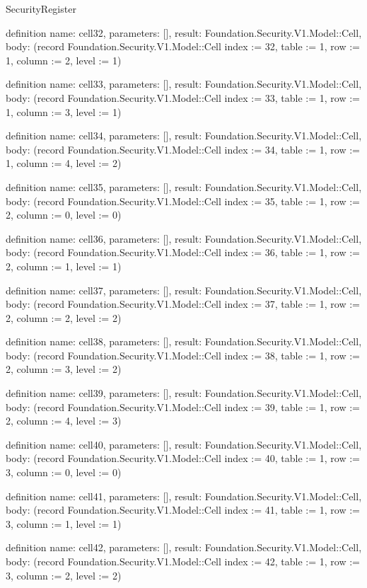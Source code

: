 \begin{lexlean}{SecurityRegister}
\begin{semanticmodule}
definition{
  name: cell32,
  parameters: [],
  result: Foundation.Security.V1.Model::Cell,
  body: (record Foundation.Security.V1.Model::Cell {index := 32, table := 1, row := 1, column := 2, level := 1})
}

definition{
  name: cell33,
  parameters: [],
  result: Foundation.Security.V1.Model::Cell,
  body: (record Foundation.Security.V1.Model::Cell {index := 33, table := 1, row := 1, column := 3, level := 1})
}

definition{
  name: cell34,
  parameters: [],
  result: Foundation.Security.V1.Model::Cell,
  body: (record Foundation.Security.V1.Model::Cell {index := 34, table := 1, row := 1, column := 4, level := 2})
}

definition{
  name: cell35,
  parameters: [],
  result: Foundation.Security.V1.Model::Cell,
  body: (record Foundation.Security.V1.Model::Cell {index := 35, table := 1, row := 2, column := 0, level := 0})
}

definition{
  name: cell36,
  parameters: [],
  result: Foundation.Security.V1.Model::Cell,
  body: (record Foundation.Security.V1.Model::Cell {index := 36, table := 1, row := 2, column := 1, level := 1})
}

definition{
  name: cell37,
  parameters: [],
  result: Foundation.Security.V1.Model::Cell,
  body: (record Foundation.Security.V1.Model::Cell {index := 37, table := 1, row := 2, column := 2, level := 2})
}

definition{
  name: cell38,
  parameters: [],
  result: Foundation.Security.V1.Model::Cell,
  body: (record Foundation.Security.V1.Model::Cell {index := 38, table := 1, row := 2, column := 3, level := 2})
}

definition{
  name: cell39,
  parameters: [],
  result: Foundation.Security.V1.Model::Cell,
  body: (record Foundation.Security.V1.Model::Cell {index := 39, table := 1, row := 2, column := 4, level := 3})
}

definition{
  name: cell40,
  parameters: [],
  result: Foundation.Security.V1.Model::Cell,
  body: (record Foundation.Security.V1.Model::Cell {index := 40, table := 1, row := 3, column := 0, level := 0})
}

definition{
  name: cell41,
  parameters: [],
  result: Foundation.Security.V1.Model::Cell,
  body: (record Foundation.Security.V1.Model::Cell {index := 41, table := 1, row := 3, column := 1, level := 1})
}

definition{
  name: cell42,
  parameters: [],
  result: Foundation.Security.V1.Model::Cell,
  body: (record Foundation.Security.V1.Model::Cell {index := 42, table := 1, row := 3, column := 2, level := 2})
}


\end{semanticmodule}
\end{lexlean}
